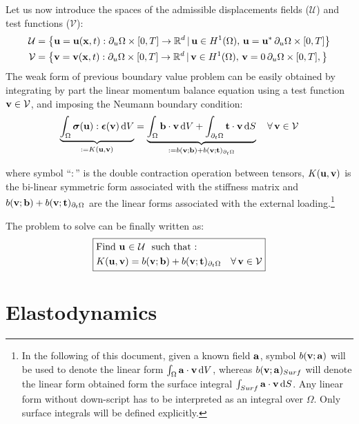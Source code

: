 Let us now introduce the spaces of the admissible displacements fields ($\mathcal{U}$) and test functions ($\mathcal{V}$):
%
\begin{equation}
\begin{aligned}\mathcal{U} & =\left\{ {\bf{u}}={\bf{u}}({\bf{x}},t):\partial_{u}\Omega\times[0,T]\to\mathbb{R}^{d}\,|\,{\bf{u}}\in H^{1}(\Omega),\,{\bf{u}}={\bf{u}}^{*}\,\partial_{u}\Omega\times[0,T]\right\} \\
\mathcal{V} & =\left\{ {\bf{v}}={\bf{v}}({\bf{x}},t):\partial_{u}\Omega\times[0,T]\to\mathbb{R}^{d}\,|\,{\bf{v}}\in H^{1}(\Omega),\,{\bf{v}}=0\,\partial_{u}\Omega\times[0,T],\right\} 
\end{aligned}
\end{equation}
%
The weak form of previous boundary value problem can be easily obtained
by integrating by part the linear momentum balance equation using
a test function ${\bf{v}}\in\mathcal{V}$, and imposing the Neumann boundary
condition:
%
\begin{equation}
%
\underbrace{\int_{\Omega}\bsigma(\bu):\bepsilon(\bv)\,{\rm d}V}_{:=K(\bu,\bv)}=\underbrace{\int_{\Omega}\bb\cdot\bv\,{\rm d}V+\int_{\partial_{t}\Omega}\bt\cdot\bv\,{\rm d}S}_{:=b(\bv;\bb)+b(\bv;\bt)_{\partial_{t}\Omega}}\quad\forall\,\bv\in\mathcal{V}
%
\end{equation}

where symbol ``$:$'' is the double contraction operation between
tensors, $K({\bf{u}},{\bf{v}})$
is the bi-linear symmetric form associated with the stiffness matrix
and $b({\bf{v}};{\bf{b}})+b({\bf{v}};{\bf t})_{\partial_{t}\Omega}$ are the linear forms
associated with the external loading.\footnote{In the following of this document, given a known field ${\bf{a}}$, symbol
$b({\bf{v}};{\bf{a}})$ will be used to denote the linear form $\int_{\Omega}{\bf{a}}\cdot{\bf{v}}\,{\rm d}V$,
whereas $b({\bf{v}};{\bf{a}})_{Surf}$ will denote the linear form obtained
form the surface integral $\int_{Surf}{\bf{a}}\cdot{\bf{v}}\,{\rm d}S$. Any
linear form without down-script has to be interpreted as an integral
over $\Omega$. Only surface integrals will be defined
explicitly.}

The problem to solve can be finally written as:
\begin{equation}
\boxed{\begin{aligned} & \text{Find}~{{\bf{u}}}~{\in}~{\mathcal{U}}~~\text{such that : }\\
 & K({\bf{u}},{\bf{v}})=b({\bf{v}};{\bf{b}})+b({\bf{v}};{\bf t})_{\partial_{t}\Omega}\quad\forall\,{\bf{v}}\in\mathcal{V}
\end{aligned}
}
\end{equation}

\section{Elastodynamics}

